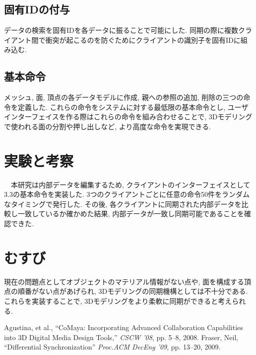 \documentclass{AIabst}
\begin{document}
	\subsection{固有IDの付与}
	データの検索を固有IDを各データに振ることで可能にした. 同期の際に複数クライアント間で衝突が起こるのを防ぐためにクライアントの識別子を固有IDに組み込む.
	\subsection{基本命令}
	メッシュ, 面, 頂点の各データモデルに作成, 親への参照の追加, 削除の三つの命令を定義した. これらの命令をシステムに対する最低限の基本命令とし, ユーザインターフェイスを作る際はこれらの命令を組み合わせることで, 3Dモデリングで使われる面の分割や押し出しなど, より高度な命令を実現できる.
\section{実験と考察}
　本研究は内部データを編集するため, クライアントのインターフェイスとして3.3の基本命令を実装した.
 3つのクライアントごとに任意の命令50件をランダムなタイミングで発行した.
 その後, 各クライアントに同期された内部データを比較し一致しているか確かめた結果, 内部データが一致し同期可能であることを確認できた.
\section{むすび}
 現在の問題点としてオブジェクトのマテリアル情報がない点や, 面を構成する頂点の順番がない点があげられ, 3Dモデリングの同期機構としては不十分である.
これらを実装することで, 3Dモデリングをより柔軟に同期ができると考えられる.

\begin{thebibliography}{9}
	Agustina, et al., ``CoMaya: Incorporating Advanced Collaboration Capabilities into 3D Digital Media Design Tools,'' {\it CSCW '08}, pp. 5--8, 2008.
  Fraser, Neil,	``Differential Synchronization''  {\it Proc.ACM DecEng '09}, pp. 13--20, 2009.
\end{thebibliography}
\end{document}
